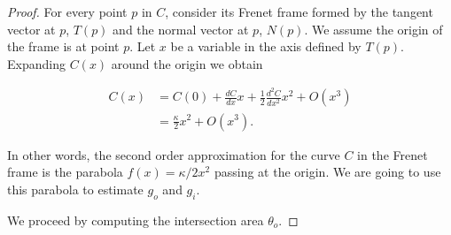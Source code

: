 \begin{proof} For every point $p$ in $C$, consider its Frenet frame formed by the tangent vector at $p$, $T(p)$ and the normal vector at $p$, $N(p)$. We assume the origin of the frame is at point $p$. Let $x$ be a variable in the axis defined by $T(p)$. Expanding $C(x)$ around the origin we obtain

\begin{align*}
	C(x) &= C(0) + \frac{dC}{dx}x + \frac{1}{2}\frac{d^2C}{dx^2}x^2 + O(x^3) \\
	&= \frac{\kappa}{2}x^2 + O(x^3).
\end{align*}

In other words, the second order approximation for the curve $C$ in the Frenet frame is the parabola $f(x) =  \kappa/2x^2$ passing at the origin. We are going to use this parabola to estimate $g_o$ and $g_i$.

We proceed by computing the intersection area $\theta_o$.



\end{proof}
